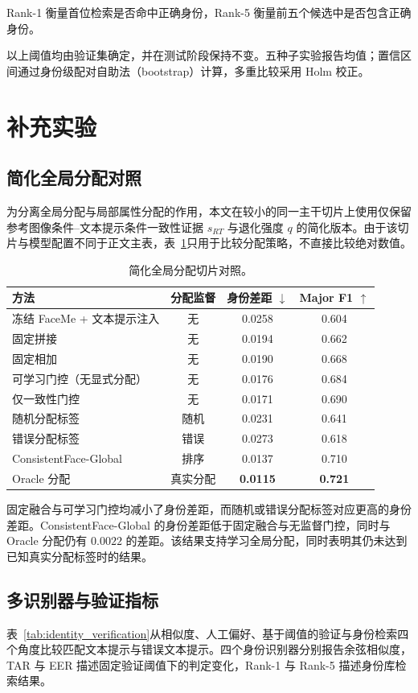 \documentclass[journal]{IEEEtran}
\begin{document}
Rank-1 衡量首位检索是否命中正确身份，Rank-5 衡量前五个候选中是否包含正确身份。

以上阈值均由验证集确定，并在测试阶段保持不变。五种子实验报告均值；置信区间通过身份级配对自助法（bootstrap）计算，多重比较采用 Holm 校正。

\section{补充实验}
\subsection{简化全局分配对照}
为分离全局分配与局部属性分配的作用，本文在较小的同一主干切片上使用仅保留参考图像条件--文本提示条件一致性证据 $s_{RT}$ 与退化强度 $q$ 的简化版本。由于该切片与模型配置不同于正文主表，表~\ref{tab:global_route_controls}只用于比较分配策略，不直接比较绝对数值。

\begin{table}[!h]
\centering
\caption{简化全局分配切片对照。}
\label{tab:global_route_controls}
{\footnotesize
\setlength{\tabcolsep}{2pt}
\begin{tabular}{lccc}
\toprule
方法 & 分配监督 & 身份差距 $\downarrow$ & Major F1 $\uparrow$ \\
\midrule
冻结 FaceMe + 文本提示注入 & 无 & 0.0258 & 0.604 \\
固定拼接 & 无 & 0.0194 & 0.662 \\
固定相加 & 无 & 0.0190 & 0.668 \\
可学习门控（无显式分配） & 无 & 0.0176 & 0.684 \\
仅一致性门控 & 无 & 0.0171 & 0.690 \\
随机分配标签 & 随机 & 0.0231 & 0.641 \\
错误分配标签 & 错误 & 0.0273 & 0.618 \\
ConsistentFace-Global & 排序 & 0.0137 & 0.710 \\
Oracle 分配 & 真实分配 & \textbf{0.0115} & \textbf{0.721} \\
\bottomrule
\end{tabular}
}
\end{table}

固定融合与可学习门控均减小了身份差距，而随机或错误分配标签对应更高的身份差距。ConsistentFace-Global 的身份差距低于固定融合与无监督门控，同时与 Oracle 分配仍有 $0.0022$ 的差距。该结果支持学习全局分配，同时表明其仍未达到已知真实分配标签时的结果。

\subsection{多识别器与验证指标}
表~\ref{tab:identity_verification}从相似度、人工偏好、基于阈值的验证与身份检索四个角度比较匹配文本提示与错误文本提示。四个身份识别器分别报告余弦相似度，TAR 与 EER 描述固定验证阈值下的判定变化，Rank-1 与 Rank-5 描述身份库检索结果。
\end{document}
